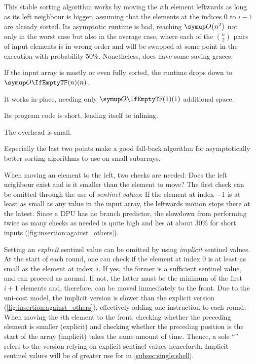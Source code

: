 \subsection{\texorpdfstring{\IS{}}{InsertionSort}}
\label{subsec:single:insertion}


This stable sorting algorithm works by moving the \(i\)th element leftwards as long as its left neighbour is bigger, assuming that the elements at the indices \(0\) to \(i - 1\) are already sorted.
Its asymptotic runtime is bad, reaching \(\bigoh*{n^2}\) not only in the worst case but also in the average case, where each of the \(\binom{n}{2}\) pairs of input elements is in wrong order and will be swapped at some point in the execution with probability 50\%.
Nonetheless, \IS{} does have some saving graces:
\begin{enumerate*}
	\item
	If the input array is mostly or even fully sorted, the runtime drops down to \(\bigoh{n}\).

	\item
	It works in-place, needing only \(\bigoh{1}\) additional space.

	\item
	Its program code is short, lending itself to inlining.

	\item
	The overhead is small.
\end{enumerate*}
Especially the last two points make \IS{} a good fall-back algorithm for asymptotically better sorting algorithms to use on small subarrays.

When moving an element to the left, two checks are needed:
Does the left neighbour exist and is it smaller than the element to move?
The first check can be omitted through the use of \emph{sentinel values}:
If the element at index \(-1\) is at least as small as any value in the input array, the leftwards motion stops there at the latest.
Since a DPU has no branch predictor, the slowdown from performing twice as many checks as needed is quite high and lies at about 30\% for short inputs (\cref{fig:insertion:against_others}).

Setting an \emph{explicit} sentinel value can be omitted by using \emph{implicit} sentinel values.
At the start of each round, one can check if the element at index \(0\) is at least as small as the element at index~\(i\).
If yes, the former is a sufficient sentinel value, and \IS{} can proceed as normal.
If not, the latter must be the minimum of the first \(i + 1\) elements and, therefore, can be moved immediately to the front.
Due to the uni-cost model, the implicit version is slower than the explicit version (\cref{fig:insertion:against_others}), effectively adding one instruction to each round:
When moving the \(i\)th element to the front, checking whether the preceding element is smaller (explicit) and checking whether the preceding position is the start of the array (implicit) takes the same amount of time.
Thence, a sole \enquote{\IS{}} refers to the version relying on explicit sentinel values henceforth.
Implicit sentinel values will be of greater use for \ShS{} in \cref{subsec:single:shell}.

